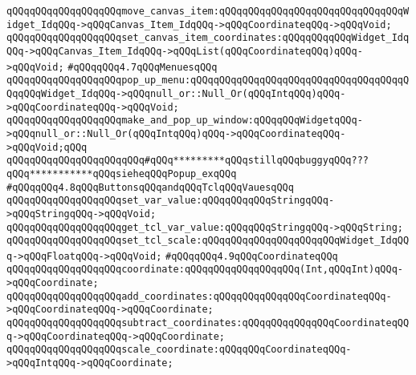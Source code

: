 \newline
\verb|qQQqqQQqqQQqqQQqqQQqmove_canvas_item:qQQqqQQqqQQqqQQqqQQqqQQqqQQqqQQqWidget_IdqQQq->qQQqCanvas_Item_IdqQQq->qQQqCoordinateqQQq->qQQqVoid;|\newline
\verb|qQQqqQQqqQQqqQQqqQQqset_canvas_item_coordinates:qQQqqQQqqQQqWidget_IdqQQq->qQQqCanvas_Item_IdqQQq->qQQqList(qQQqCoordinateqQQq)qQQq->qQQqVoid;|\newline
\newline
\verb|#qQQqqQQq4.7qQQqMenuesqQQq|\newline
\verb|qQQqqQQqqQQqqQQqqQQqpop_up_menu:qQQqqQQqqQQqqQQqqQQqqQQqqQQqqQQqqQQqqQQqqQQqWidget_IdqQQq->qQQqnull_or::Null_Or(qQQqIntqQQq)qQQq->qQQqCoordinateqQQq->qQQqVoid;|\newline
\newline
\verb|qQQqqQQqqQQqqQQqqQQqmake_and_pop_up_window:qQQqqQQqWidgetqQQq->qQQqnull_or::Null_Or(qQQqIntqQQq)qQQq->qQQqCoordinateqQQq->qQQqVoid;qQQq|\newline
\verb|qQQqqQQqqQQqqQQqqQQqqQQq#qQQq*********qQQqstillqQQqbuggyqQQq???qQQq***********qQQqsieheqQQqPopup_exqQQq|\newline
\newline
\newline
\verb|#qQQqqQQq4.8qQQqButtonsqQQqandqQQqTclqQQqVauesqQQq|\newline
\newline
\verb|qQQqqQQqqQQqqQQqqQQqset_var_value:qQQqqQQqqQQqStringqQQq->qQQqStringqQQq->qQQqVoid;|\newline
\verb|qQQqqQQqqQQqqQQqqQQqget_tcl_var_value:qQQqqQQqStringqQQq->qQQqString;|\newline
\verb|qQQqqQQqqQQqqQQqqQQqset_tcl_scale:qQQqqQQqqQQqqQQqqQQqqQQqWidget_IdqQQq->qQQqFloatqQQq->qQQqVoid;|\newline
\newline
\verb|#qQQqqQQq4.9qQQqCoordinateqQQq|\newline
\newline
\verb|qQQqqQQqqQQqqQQqqQQqcoordinate:qQQqqQQqqQQqqQQqqQQq(Int,qQQqInt)qQQq->qQQqCoordinate;|\newline
\verb|qQQqqQQqqQQqqQQqqQQqadd_coordinates:qQQqqQQqqQQqqQQqCoordinateqQQq->qQQqCoordinateqQQq->qQQqCoordinate;|\newline
\verb|qQQqqQQqqQQqqQQqqQQqsubtract_coordinates:qQQqqQQqqQQqqQQqCoordinateqQQq->qQQqCoordinateqQQq->qQQqCoordinate;|\newline
\verb|qQQqqQQqqQQqqQQqqQQqscale_coordinate:qQQqqQQqCoordinateqQQq->qQQqIntqQQq->qQQqCoordinate;|\newline
